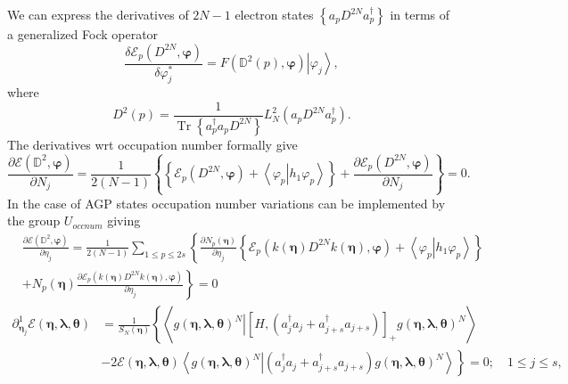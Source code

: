\documentclass[aps,preprint]{revtex4}%
\begin{document}
We can express the derivatives of $2N-1$ electron states $\left\{  a_{p}%
D^{2N}a_{p}^{\dagger}\right\}  $ in terms of a generalized Fock operator%
\begin{equation}
\frac{\delta\mathcal{E}_{p}\left(  D^{2N},\mathbf{\varphi}\right)  }%
{\delta\varphi_{j}^{\ast}}=F\left(  \mathbb{D}^{2}\left(  p\right)
,\mathbf{\varphi}\right)  \left\vert \varphi_{j}\right\rangle ,
\end{equation}
where
\begin{equation}
D^{2}\left(  p\right)  =\frac{1}{\operatorname{Tr}\left\{  a_{p}^{\dagger
}a_{p}D^{2N}\right\}  }L_{N}^{2}\left(  a_{p}D^{2N}a_{p}^{\dagger}\right)  .
\end{equation}
The derivatives wrt occupation number formally give
\begin{equation}
\frac{\partial\mathcal{E}\left(  \mathbb{D}^{2},\mathbf{\varphi}\right)
}{\partial N_{j}}=\frac{1}{2\left(  N-1\right)  }\left\{  \left\{
\mathcal{E}_{p}\left(  D^{2N},\mathbf{\varphi}\right)  +\left\langle \left.
\varphi_{p}\right\vert h_{1}\varphi_{p}\right\rangle \right\}  +\frac
{\partial\mathcal{E}_{p}\left(  D^{2N},\mathbf{\varphi}\right)  }{\partial
N_{j}}\right\}  =0.
\end{equation}
In the case of AGP states occupation number variations can be implemented by
the group $U_{occnum}$ giving
\begin{align}
&  \frac{\partial\mathcal{E}\left(  \mathbb{D}^{2},\mathbf{\varphi}\right)
}{\partial\eta_{j}}=\frac{1}{2\left(  N-1\right)  }\sum_{1\leq p\leq
2s}\left\{  \frac{\partial N_{p}\left(  \mathbf{\eta}\right)  }{\partial
\eta_{j}}\left\{  \mathcal{E}_{p}\left(  k\left(  \mathbf{\eta}\right)
D^{2N}k\left(  \mathbf{\eta}\right)  ,\mathbf{\varphi}\right)  +\left\langle
\left.  \varphi_{p}\right\vert h_{1}\varphi_{p}\right\rangle \right\}  \right.
\\
&  \left.  +\right.  \left.  N_{p}\left(  \mathbf{\eta}\right)  \frac
{\partial\mathcal{E}_{p}\left(  k\left(  \mathbf{\eta}\right)  D^{2N}k\left(
\mathbf{\eta}\right)  ,\mathbf{\varphi}\right)  }{\partial\eta_{j}}\right\}
=0
\end{align}%
\begin{align}
\partial_{\mathbf{\eta}_{j}}^{1}\mathcal{E}\left(  \mathbf{\eta}%
,\mathbf{\lambda},\mathbf{\theta}\right)   &  =\frac{1}{S_{N}\left(
\mathbf{\eta}\right)  }\left\{  \left\langle \left.  g\left(  \mathbf{\eta
},\mathbf{\lambda},\mathbf{\theta}\right)  ^{N}\right\vert \left[  H,\left(
a_{j}^{\dagger}a_{j}+a_{j+s}^{\dagger}a_{j+s}\right)  \right]  _{+}g\left(
\mathbf{\eta},\mathbf{\lambda},\mathbf{\theta}\right)  ^{N}\right\rangle
\right. \nonumber\\
&  -\left.  2\mathcal{E}\left(  \mathbf{\eta},\mathbf{\lambda},\mathbf{\theta
}\right)  \left\langle \left.  g\left(  \mathbf{\eta},\mathbf{\lambda
},\mathbf{\theta}\right)  ^{N}\right\vert \left(  a_{j}^{\dagger}a_{j}%
+a_{j+s}^{\dagger}a_{j+s}\right)  g\left(  \mathbf{\eta},\mathbf{\lambda
},\mathbf{\theta}\right)  ^{N}\right\rangle \right\}  =0;\quad1\leq j\leq s,
\end{align}%
\end{document}

